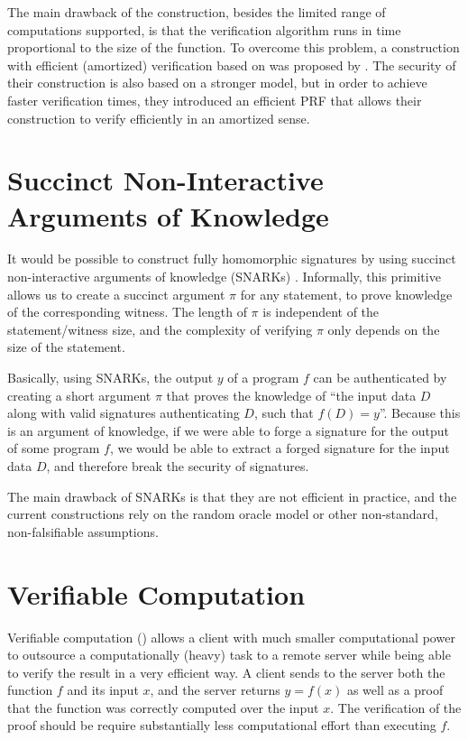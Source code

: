 The main drawback of the  construction, besides
the limited range of computations supported, is that the verification algorithm
runs in time proportional to the size of the function. To overcome this
problem, a construction with efficient (amortized) verification based on
 was proposed by
\textcite{backes:fiore:reischuk:2013}. The security of their construction is
also based on a stronger model, but in order to achieve faster verification
times, they introduced an efficient PRF that allows their construction to
verify efficiently in an amortized sense.

\section{Succinct Non-Interactive Arguments of Knowledge}
It would be possible to construct fully homomorphic signatures by using
succinct non-interactive arguments of knowledge (SNARKs)
\cite{cryptoeprint:2011:443}. Informally, this primitive allows us to create
a succinct argument $\pi$ for any  statement, to prove knowledge
of the corresponding witness.  The length of $\pi$ is independent of the
statement/witness size, and the complexity of verifying $\pi$ only depends on
the size of the statement.

Basically, using SNARKs, the output $y$ of a program $f$ can be authenticated
by creating a short argument $\pi$ that proves the knowledge of ``the input
data $D$ along with valid signatures authenticating $D$, such that $f(D)
= y$''. Because this is an argument of knowledge, if we were able to forge
a signature for the output of some program $f$, we would be able to extract
a forged signature for the input data $D$, and therefore break the security of
signatures.

The main drawback of SNARKs is that they are not efficient in practice, and
the current constructions rely on the random oracle model or other
non-standard, non-falsifiable assumptions.

\section{Verifiable Computation}
Verifiable computation () allows a client with
much smaller computational power to outsource a computationally (heavy) task to
a remote server while being able to verify the result in a very efficient way.
A client sends to the server both the function $f$ and its input $x$, and the
server returns $y = f(x)$ as well as a proof that the function was correctly
computed over the input $x$. The verification of the proof should be require
substantially less computational effort than executing $f$.


